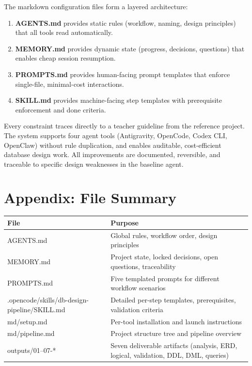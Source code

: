\documentclass[12pt,a4paper]{article}
\begin{document}
The markdown configuration files form a layered architecture:
\begin{enumerate}
    \item \textbf{AGENTS.md} provides static rules (workflow, naming, design principles) that all tools read automatically.
    \item \textbf{MEMORY.md} provides dynamic state (progress, decisions, questions) that enables cheap session resumption.
    \item \textbf{PROMPTS.md} provides human-facing prompt templates that enforce single-file, minimal-cost interactions.
    \item \textbf{SKILL.md} provides machine-facing step templates with prerequisite enforcement and done criteria.
\end{enumerate}

Every constraint traces directly to a teacher guideline from the reference project. The system supports four agent tools (Antigravity, OpenCode, Codex CLI, OpenClaw) without rule duplication, and enables auditable, cost-efficient database design work. All improvements are documented, reversible, and traceable to specific design weaknesses in the baseline agent.

\section*{Appendix: File Summary}

\begin{table}[h]
\centering
\begin{tabular}{|l|p{6cm}|}
\hline
\textbf{File} & \textbf{Purpose} \\
\hline
AGENTS.md & Global rules, workflow order, design principles \\
\hline
MEMORY.md & Project state, locked decisions, open questions, traceability \\
\hline
PROMPTS.md & Five templated prompts for different workflow scenarios \\
\hline
.opencode/skills/db-design-pipeline/SKILL.md & Detailed per-step templates, prerequisites, validation criteria \\
\hline
md/setup.md & Per-tool installation and launch instructions \\
\hline
md/pipeline.md & Project structure tree and pipeline overview \\
\hline
outputs/01--07-* & Seven deliverable artifacts (analysis, ERD, logical, validation, DDL, DML, queries) \\
\hline
\end{tabular}
\end{table}
\end{document}
